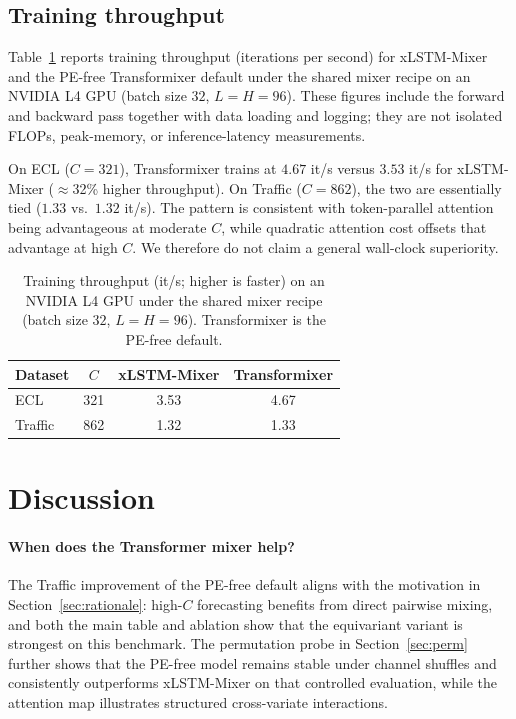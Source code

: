 \documentclass{article}
\begin{document}
\subsection{Training throughput}
\label{sec:throughput}

Table~\ref{tab:throughput} reports training throughput (iterations per second) for xLSTM-Mixer and the PE-free Transformixer default under the shared mixer recipe on an NVIDIA L4 GPU (batch size $32$, $L{=}H{=}96$).
These figures include the forward and backward pass together with data loading and logging; they are not isolated FLOPs, peak-memory, or inference-latency measurements.

On ECL ($C{=}321$), Transformixer trains at $4.67$ it/s versus $3.53$ it/s for xLSTM-Mixer ($\approx$32\% higher throughput).
On Traffic ($C{=}862$), the two are essentially tied ($1.33$ vs.\ $1.32$ it/s).
The pattern is consistent with token-parallel attention being advantageous at moderate $C$, while quadratic attention cost offsets that advantage at high $C$.
We therefore do not claim a general wall-clock superiority.

\begin{table}[t]
  \centering
  \caption{Training throughput (it/s; higher is faster) on an NVIDIA L4 GPU under the shared mixer recipe (batch size $32$, $L{=}H{=}96$). Transformixer is the PE-free default.}
  \label{tab:throughput}
  \begin{tabular}{lccc}
    \toprule
    Dataset & $C$ & xLSTM-Mixer & Transformixer \\
    \midrule
    ECL     & 321 & 3.53 & 4.67 \\
    Traffic & 862 & 1.32 & 1.33 \\
    \bottomrule
  \end{tabular}
\end{table}

\section{Discussion}
\label{sec:discussion}

\paragraph{When does the Transformer mixer help?}
The Traffic improvement of the PE-free default aligns with the motivation in Section~\ref{sec:rationale}: high-$C$ forecasting benefits from direct pairwise mixing, and both the main table and ablation show that the equivariant variant is strongest on this benchmark.
The permutation probe in Section~\ref{sec:perm} further shows that the PE-free model remains stable under channel shuffles and consistently outperforms xLSTM-Mixer on that controlled evaluation, while the attention map illustrates structured cross-variate interactions.
\end{document}
